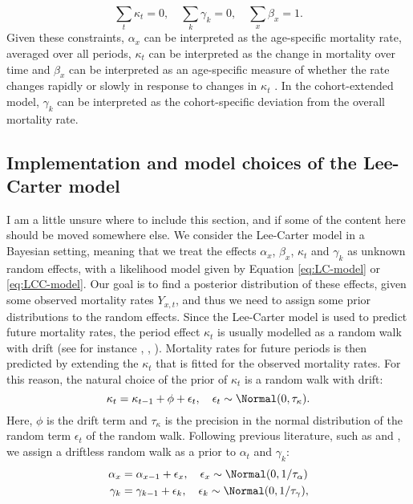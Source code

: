 \begin{equation}
    \sum_t\kappa_t = 0,\quad \sum_k\gamma_k = 0, \quad \sum_x\beta_x = 1.
    \label{eq:LC-constraints}    
\end{equation}
Given these constraints, $\alpha_x$ can be interpreted as the age-specific mortality rate, averaged over all periods, $\kappa_t$ can be interpreted as the change in mortality over time and $\beta_x$ can be interpreted as an age-specific measure of whether the rate changes rapidly or slowly in response to changes in $\kappa_t$ \cite{LeeCarter1992}. In the cohort-extended model, $\gamma_k$ can be interpreted as the cohort-specific deviation from the overall mortality rate.

\subsection{Implementation and model choices of the Lee-Carter model}
\textcolor{myDarkGreen}{I am a little unsure where to include this section, and if some of the content here should be moved somewhere else. }
We consider the Lee-Carter model in a Bayesian setting, meaning that we treat the effects $\alpha_x$, $\beta_x$, $\kappa_t$ and $\gamma_k$ as unknown random effects, with a likelihood model given by Equation \ref{eq:LC-model} or \ref{eq:LCC-model}. Our goal is to find a posterior distribution of these effects, given some observed mortality rates $Y_{x,t}$, and thus we need to assign some prior distributions to the random effects. Since the Lee-Carter model is used to predict future mortality rates, the period effect $\kappa_t$ is usually modelled as a random walk with drift (see for instance \cite{LeeCarter1992}, \cite{Wisniowski2015}, \cite{CZADO2005260}). Mortality rates for future periods is then predicted by extending the $\kappa_t$ that is fitted for the observed mortality rates. For this reason, the natural choice of the prior of $\kappa_t$ is a random walk with drift:
\begin{equation}
    \kappa_t = \kappa_{t-1} + \phi  + \epsilon_t,\quad \epsilon_t \sim \Normal(0,\tau_{\kappa}).
    \label{eq:randomWalkDrift}
\end{equation}
Here, $\phi$ is the drift term and $\tau_{\kappa}$ is the precision in the normal distribution of the random term $\epsilon_t$ of the random walk. 
Following previous literature, such as \textcite{CZADO2005260} and \textcite{Wisniowski2015}, we assign a driftless random walk as a prior to $\alpha_t$ and $\gamma_k$:
\begin{equation}
    \begin{aligned}
        \alpha_x &= \alpha_{x-1} + \epsilon_{x}, \quad \epsilon_x \sim \Normal(0,1/\tau_{\alpha}) \\
        \gamma_k &= \gamma_{k-1} + \epsilon_{k}, \quad \epsilon_k \sim \Normal(0,1/\tau_{\gamma}), \\
    \end{aligned}
\end{equation}

